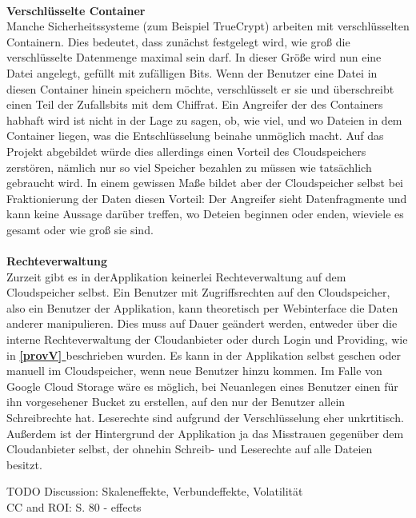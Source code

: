 \documentclass[13pt,a4paper,bibliography=totocnumbered,listof=totocnumbered]{scrartcl}
\newcommand*{\fullref}[1]{\textbf{\hyperref[{#1}]{\ref*{#1} \nameref*{#1}}}}
\begin{document}
\\\textbf{Verschlüsselte Container}\\
Manche Sicherheitssysteme (zum Beispiel TrueCrypt) arbeiten mit verschlüsselten Containern. Dies bedeutet, dass zunächst festgelegt wird, wie groß die verschlüsselte Datenmenge maximal sein darf. In dieser Größe wird nun eine Datei angelegt, gefüllt mit zufälligen Bits. Wenn der Benutzer eine Datei in diesen Container hinein speichern möchte, verschlüsselt er sie und überschreibt einen Teil der Zufallsbits mit dem Chiffrat. Ein Angreifer der des Containers habhaft wird ist nicht in der Lage zu sagen, ob, wie viel, und wo Dateien in dem Container liegen, was die Entschlüsselung beinahe unmöglich macht. Auf das Projekt abgebildet würde dies allerdings einen Vorteil des Cloudspeichers zerstören, nämlich nur so viel Speicher bezahlen zu müssen wie tatsächlich gebraucht wird. In einem gewissen Maße bildet aber der Cloudspeicher selbst bei Fraktionierung der Daten diesen Vorteil: Der Angreifer sieht Datenfragmente und kann keine Aussage darüber treffen, wo Deteien beginnen oder enden, wieviele es gesamt oder wie groß sie sind.\\
\\\textbf{Rechteverwaltung}\\
Zurzeit gibt es in derApplikation keinerlei Rechteverwaltung auf dem Cloudspeicher selbst. Ein Benutzer mit Zugriffsrechten auf den Cloudspeicher, also ein Benutzer der Applikation, kann theoretisch per Webinterface die Daten anderer manipulieren. Dies muss auf Dauer geändert werden, entweder über die interne Rechteverwaltung der Cloudanbieter oder durch Login und Providing, wie in \fullref{provV} beschrieben wurden. Es kann in der Applikation selbst geschen oder manuell im Cloudspeicher, wenn neue Benutzer hinzu kommen. Im Falle von Google Cloud Storage wäre es möglich, bei Neuanlegen eines Benutzer einen für ihn vorgesehener Bucket zu erstellen, auf den nur der Benutzer allein Schreibrechte hat. Leserechte sind aufgrund der Verschlüsselung eher unkrtitisch. Außerdem ist der Hintergrund der Applikation ja das Misstrauen gegenüber dem Cloudanbieter selbst, der ohnehin Schreib- und Leserechte auf alle Dateien besitzt.

TODO Discussion: Skaleneffekte, Verbundeffekte, Volatilität\\
CC and ROI: S. 80 - effects \cite[S. 80]{45}
\pagebreak


	
{\raggedright 

 
 
 \nocite{41}
 \nocite{42}
 \nocite{43}
}
\pagebreak
\end{document}
